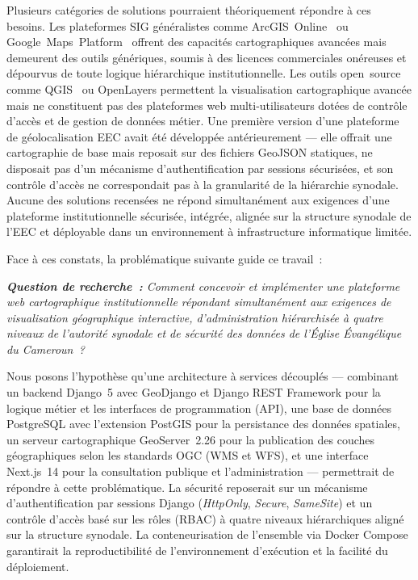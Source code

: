 \documentclass[12pt, a4paper]{report}
\begin{document}
Plusieurs catégories de solutions pourraient théoriquement répondre à ces besoins.
Les plateformes SIG généralistes comme ArcGIS~Online~\cite{arcgisonline2024} ou
Google~Maps~Platform~\cite{googlemaps2024} offrent des capacités cartographiques
avancées mais demeurent des outils génériques, soumis à des licences commerciales
onéreuses et dépourvus de toute logique hiérarchique institutionnelle. Les outils
open~source comme QGIS~\cite{qgis2024} ou OpenLayers permettent la visualisation
cartographique avancée mais ne constituent pas des plateformes web multi-utilisateurs
dotées de contrôle d'accès et de gestion de données métier. Une première version
d'une plateforme de géolocalisation EEC avait été développée antérieurement --- elle
offrait une cartographie de base mais reposait sur des fichiers GeoJSON statiques,
ne disposait pas d'un mécanisme d'authentification par sessions sécurisées, et son
contrôle d'accès ne correspondait pas à la granularité de la hiérarchie synodale.
Aucune des solutions recensées ne répond simultanément aux exigences d'une
plateforme institutionnelle sécurisée, intégrée, alignée sur la structure synodale
de l'EEC et déployable dans un environnement à infrastructure informatique limitée.

\medskip

Face à ces constats, la problématique suivante guide ce travail~:

\vspace{6pt}
\noindent\colorbox{eeclightgreen!80}{\parbox{0.88\linewidth}{%
  \vspace{6pt}%
  \noindent\textit{\textbf{Question de recherche~:} Comment concevoir et
  implémenter une plateforme web cartographique institutionnelle répondant
  simultanément aux exigences de visualisation géographique interactive,
  d'administration hiérarchisée à quatre niveaux de l'autorité synodale et de
  sécurité des données de l'Église Évangélique du Cameroun~?}%
  \vspace{6pt}%
}}
\vspace{6pt}

Nous posons l'hypothèse qu'une architecture à services découplés --- combinant un
backend Django~5 avec GeoDjango et Django REST Framework pour la logique métier et
les interfaces de programmation (API), une base de données PostgreSQL avec
l'extension PostGIS pour la persistance des données spatiales, un serveur
cartographique GeoServer~2.26 pour la publication des couches géographiques selon
les standards OGC (WMS et WFS), et une interface Next.js~14 pour la consultation
publique et l'administration --- permettrait de répondre à cette problématique. La
sécurité reposerait sur un mécanisme d'authentification par sessions Django
(\textit{HttpOnly}, \textit{Secure}, \textit{SameSite}) et un contrôle d'accès
basé sur les rôles (RBAC) à quatre niveaux hiérarchiques aligné sur la structure
synodale. La conteneurisation de l'ensemble via Docker Compose garantirait la
reproductibilité de l'environnement d'exécution et la facilité du déploiement.
\end{document}
